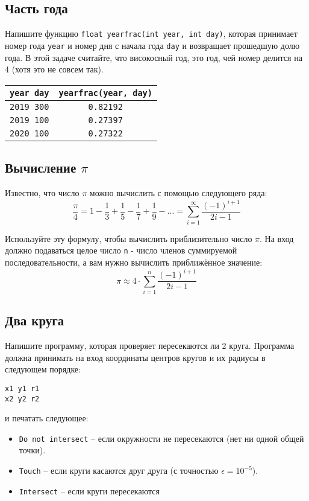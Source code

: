 \documentclass{article}
\begin{document}
\subsection{Часть года}
Напишите функцию \texttt{float yearfrac(int year, int day)}, которая принимает номер года \texttt{year} и номер дня с начала года \texttt{day} и возвращает прошедшую долю года. В этой задаче считайте, что високосный год, это год, чей номер делится на 4 (хотя это не совсем так).
\begin{center}
\begin{tabular}{ c c }
 \texttt{year day} & \texttt{yearfrac(year, day)} \\ \hline
 \texttt{2019 300} & \texttt{0.82192}  \\
 \texttt{2019 100} & \texttt{0.27397}  \\ 
 \texttt{2020 100} & \texttt{0.27322}  \\ 
\end{tabular}
\end{center}

\subsection{Вычисление $\pi$} 
Известно, что число $\pi$ можно вычислить с помощью следующего ряда:
$$
\frac{\pi}{4} = 1 - \frac{1}{3} + \frac{1}{5} - \frac{1}{7} + \frac{1}{9} - ... = \sum_{i=1}^{\infty} \frac{(-1)^{i + 1}}{2i-1}
$$

Используйте эту формулу, чтобы вычислить приблизительно число $\pi$. На вход должно подаваться целое число \texttt{n} - число членов суммируемой последовательности, а вам нужно вычислить приближённое значение:
$$
\pi \approx 4 \cdot \sum_{i=1}^{n} \frac{(-1)^{i + 1}}{2i-1}
$$


\subsection{Два круга}
Напишите программу, которая проверяет пересекаются ли 2 круга. Программа должна принимать на вход координаты центров кругов и их радиусы в следующем порядке:
\begin{verbatim}
x1 y1 r1
x2 y2 r2
\end{verbatim}
и печатать следующее:
\begin{itemize}
\item \texttt{Do not intersect} -- если окружности не пересекаются (нет ни одной общей точки).
\item \texttt{Touch} -- если круги касаются друг друга (с точностью $\epsilon = 10^{-5}$).
\item \texttt{Intersect} -- если круги пересекаются
\end{itemize}
\end{document}
